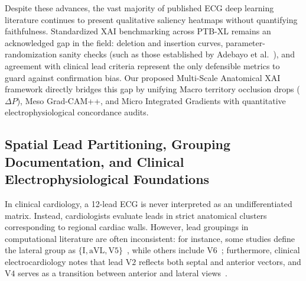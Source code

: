 \documentclass[12pt]{elsarticle}
\begin{document}
Despite these advances, the vast majority of published ECG deep learning literature continues to present qualitative saliency heatmaps without quantifying faithfulness. Standardized XAI benchmarking across PTB-XL remains an acknowledged gap in the field: deletion and insertion curves, parameter-randomization sanity checks (such as those established by Adebayo et al.~\cite{adebayo2018sanity}), and agreement with clinical lead criteria represent the only defensible metrics to guard against confirmation bias. Our proposed Multi-Scale Anatomical XAI framework directly bridges this gap by unifying Macro territory occlusion drops ($\Delta P$), Meso Grad-CAM++, and Micro Integrated Gradients with quantitative electrophysiological concordance audits.

\subsection{Spatial Lead Partitioning, Grouping Documentation, and Clinical Electrophysiological Foundations}
\label{sec:lead_grouping_justification}
In clinical cardiology, a 12-lead ECG is never interpreted as an undifferentiated matrix. Instead, cardiologists evaluate leads in strict anatomical clusters corresponding to regional cardiac walls. However, lead groupings in computational literature are often inconsistent: for instance, some studies define the lateral group as $\{\text{I}, \text{aVL}, \text{V5}\}$~\cite{sweeney2024lead}, while others include $\text{V6}$~\cite{anat_graph2026}; furthermore, clinical electrocardiology notes that lead $\text{V2}$ reflects both septal and anterior vectors, and $\text{V4}$ serves as a transition between anterior and lateral views~\cite{wagner2009aha}.
\end{document}
